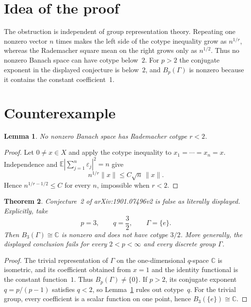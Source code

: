 \documentclass[11pt]{article}
\newtheorem{theorem}{Theorem}
\newtheorem{lemma}[theorem]{Lemma}
\newcommand{\C}{\mathbb C}
\begin{document}
\section{Idea of the proof}

The obstruction is independent of group representation theory.  Repeating
one nonzero vector $n$ times makes the left side of the cotype inequality
grow as $n^{1/r}$, whereas the Rademacher square mean on the right grows only
as $n^{1/2}$.  Thus no nonzero Banach space can have cotype below~$2$.
For $p>2$ the conjugate exponent in the displayed conjecture is below~$2$,
and $B_p(\Gamma)$ is nonzero because it contains the constant coefficient~1.

\section{Counterexample}

\begin{lemma}\label{lem:no-small-cotype}
No nonzero Banach space has Rademacher cotype $r<2$.
\end{lemma}

\begin{proof}
Let $0\ne x\in X$ and apply the cotype inequality to
$x_1=\cdots=x_n=x$.  Independence and
$\mathbb E|\sum_{j=1}^n\varepsilon_j|^2=n$ give
\[
 n^{1/r}\|x\|
 \le C\sqrt n\,\|x\|.
\]
Hence $n^{1/r-1/2}\le C$ for every $n$, impossible when $r<2$.
\end{proof}

\begin{theorem}\label{thm:counterexample}
Conjecture~2 of arXiv:1901.07496v2 is false as literally displayed.
Explicitly, take
\[
 p=3,\qquad q=\frac32,\qquad \Gamma=\{e\}.
\]
Then $B_3(\Gamma)\cong\C$ is nonzero and does not have cotype $3/2$.
More generally, the displayed conclusion fails for every $2<p<\infty$ and
every discrete group $\Gamma$.
\end{theorem}

\begin{proof}
The trivial representation of $\Gamma$ on the one-dimensional $q$-space
$\C$ is isometric, and its coefficient obtained from $x=1$ and the identity
functional is the constant function~$1$.  Thus $B_p(\Gamma)\ne\{0\}$.
If $p>2$, its conjugate exponent $q=p/(p-1)$ satisfies $q<2$, so
Lemma~\ref{lem:no-small-cotype} rules out cotype~$q$.  For the trivial group,
every coefficient is a scalar function on one point, hence
$B_3(\{e\})\cong\C$.
\end{proof}
\end{document}
